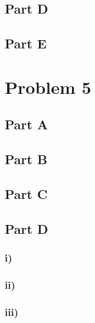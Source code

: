 \documentclass[12pt]{article}
\begin{document}
\subsection*{Part D}

\subsection*{Part E}


\section*{Problem 5}

\subsection*{Part A}

\subsection*{Part B}

\subsection*{Part C}

\subsection*{Part D}

\subsubsection*{i)}

\subsubsection*{ii)}

\subsubsection*{iii)}
\end{document}
